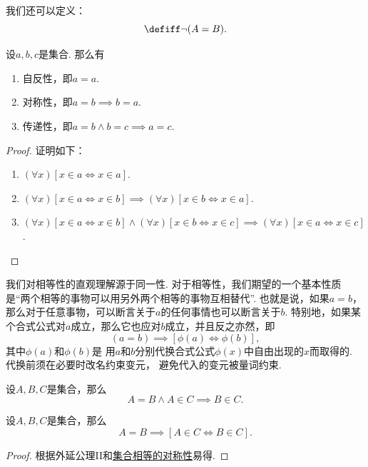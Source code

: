 我们还可以定义：\begin{equation*}
	[A \neq B] \defiff \neg(A=B).
\end{equation*}

\begin{property}
设\(a,b,c\)是集合.
那么有\begin{enumerate}
	\item\label{item:集合论.集合相等的自反性}
	自反性，即\(a=a\).
	\item\label{item:集合论.集合相等的对称性}
	对称性，即\(a=b \implies b=a\).
	\item\label{item:集合论.集合相等的传递性}
	传递性，即\(a=b \land b=c \implies a=c\).
\end{enumerate}
\begin{proof}
证明如下：
\begin{enumerate}
	\item \((\forall x)[x \in a \iff x \in a]\).
	\item \((\forall x)[x \in a \iff x \in b] \implies (\forall x)[x \in b \iff x \in a]\).
	\item \((\forall x)[x \in a \iff x \in b] \land (\forall x)[x \in b \iff x \in c]
	\implies (\forall x)[x \in a \iff x \in c]\).
	\qedhere
\end{enumerate}
\end{proof}
\end{property}

我们对相等性的直观理解源于同一性.
对于相等性，我们期望的一个基本性质是“两个相等的事物可以用另外两个相等的事物互相替代”.
也就是说，如果\(a=b\)，那么对于任意事物，可以断言关于\(a\)的任何事情也可以断言关于\(b\).
特别地，如果某个合式公式对\(a\)成立，那么它也应对\(b\)成立，并且反之亦然，即\begin{equation*}
	(a=b)\implies[\phi(a)\iff\phi(b)],
\end{equation*}
其中\(\phi(a)\)和\(\phi(b)\)是%
用\(a\)和\(b\)分别代换合式公式\(\phi(x)\)中自由出现的\(x\)而取得的.
代换前须在必要时改名约束变元，
避免代入的变元被量词约束.

\begin{axiom}[外延公理II]
设\(A,B,C\)是集合，那么\begin{equation*}
	A=B \land A \in C \implies B \in C.
\end{equation*}
\end{axiom}

\begin{property}
设\(A,B,C\)是集合，那么\begin{equation*}
	A=B \implies [A \in C \iff B \in C].
\end{equation*}
\begin{proof}
根据外延公理II和\hyperref[item:集合论.集合相等的对称性]{集合相等的对称性}易得.
\end{proof}
\end{property}

